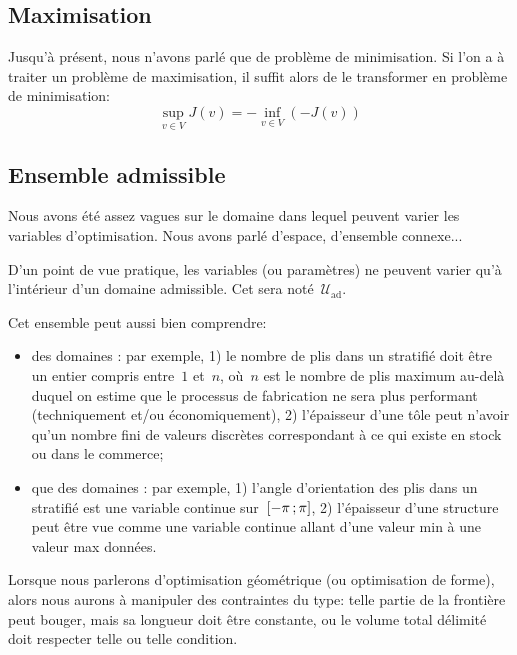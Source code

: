 \subsection{Maximisation}

Jusqu'à présent, nous n'avons parlé que de problème de minimisation.
Si l'on a à traiter un problème de maximisation, il suffit alors de le transformer en problème de minimisation:
\begin{equation}
\sup_{v\in V} J(v)=-\inf_{v\in V} (-J(v))
\end{equation}

\medskip
\subsection{Ensemble admissible}

Nous avons été assez vagues sur le domaine dans lequel peuvent varier les variables d'optimisation. Nous avons parlé d'espace, d'ensemble connexe...

D'un point de vue pratique, les variables (ou paramètres) ne peuvent varier qu'à l'intérieur d'un domaine admissible. Cet  sera noté~$\mathscr{U}_{\text{ad}}$.

\medskip
Cet ensemble peut aussi bien comprendre:
\begin{itemize}
   \item des domaines : par exemple, 1) le nombre de plis dans un stratifié doit être un entier compris entre~$1$ et~$n$, où~$n$ est le nombre de plis maximum au-delà duquel on estime que le processus de fabrication ne sera plus performant (techniquement et/ou économiquement), 2) l'épaisseur d'une tôle peut n'avoir qu'un nombre fini de valeurs discrètes correspondant à ce qui existe en stock ou dans le commerce;
   \item que des domaines : par exemple, 1) l'angle d'orientation des plis dans un stratifié est une variable continue sur~$\mathopen{[}-\pi\,;\pi\mathclose{]}$, 2) l'épaisseur d'une structure peut être vue comme une variable continue allant d'une valeur min à une valeur max données.
\end{itemize}

Lorsque nous parlerons d'optimisation géométrique (ou optimisation de forme), alors nous aurons à manipuler des contraintes du type: telle partie de la frontière peut bouger, mais sa longueur doit être constante, ou le volume total délimité doit respecter telle ou telle condition.

